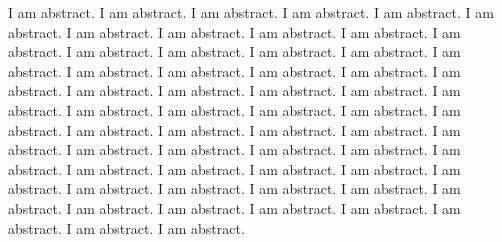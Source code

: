 I am abstract. I am abstract. I am abstract. I am abstract. I am abstract. I am abstract. I am abstract. I am abstract. I am abstract. I am abstract. I am abstract. I am abstract. I am abstract. I am abstract. I am abstract. I am abstract. I am abstract. I am abstract. I am abstract. I am abstract. I am abstract. I am abstract. I am abstract. I am abstract. I am abstract. I am abstract. I am abstract. I am abstract. I am abstract. I am abstract. I am abstract. I am abstract. I am abstract. I am abstract. I am abstract. I am abstract. I am abstract. I am abstract. I am abstract. I am abstract. I am abstract. I am abstract. I am abstract. I am abstract. I am abstract. I am abstract. I am abstract. I am abstract. I am abstract. I am abstract. I am abstract. I am abstract. I am abstract. I am abstract. I am abstract. I am abstract. I am abstract. I am abstract. 